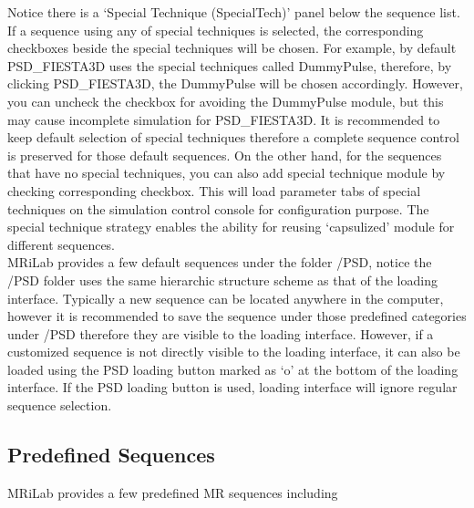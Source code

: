 \documentclass{book}%
\begin{document}
Notice there is a `Special Technique (SpecialTech)' panel below the sequence list. If a sequence using any of special techniques is selected, the corresponding checkboxes beside the special techniques will be chosen. For example, by default PSD\_FIESTA3D uses the special techniques called DummyPulse, therefore, by clicking PSD\_FIESTA3D, the DummyPulse will be chosen accordingly. However, you can uncheck the checkbox for avoiding the DummyPulse module, but this may cause incomplete simulation for PSD\_FIESTA3D. It is recommended to keep default selection of special techniques therefore a complete sequence control is preserved for those default sequences. On the other hand, for the sequences that have no special techniques, you can also add special technique module by checking corresponding checkbox. This will load parameter tabs of special techniques on the simulation control console for configuration purpose. The special technique strategy enables the ability for reusing `capsulized' module for different sequences. \\

MRiLab provides a few default sequences under the folder /PSD, notice the /PSD folder uses the same hierarchic structure scheme as that of the loading interface. Typically a new sequence can be located anywhere in the computer, however it is recommended to save the sequence under those predefined categories under /PSD therefore they are visible to the loading interface. However, if a customized sequence is not directly visible to the loading interface, it can also be loaded using the PSD loading button marked as `o' at the bottom of the loading interface. If the PSD loading button is used, loading interface will ignore regular sequence selection.

\subsection{Predefined Sequences}
MRiLab provides a few predefined MR sequences including
\end{document}
